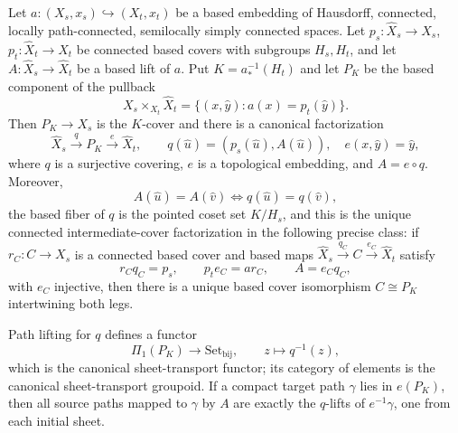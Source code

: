 \begin{theorem}\label{thm:sheet-resolution}
Let \(a:(X_s,x_s)\hookrightarrow(X_t,x_t)\) be a based embedding of Hausdorff, connected, locally path-connected, semilocally simply connected spaces. Let \(p_s:\hat X_s\to X_s\), \(p_t:\hat X_t\to X_t\) be connected based covers with subgroups \(H_s,H_t\), and let \(A:\hat X_s\to\hat X_t\) be a based lift of \(a\). Put \(K=a_*^{-1}(H_t)\) and let \(P_K\) be the based component of the pullback
\[
X_s\times_{X_t}\hat X_t=\{(x,\hat y):a(x)=p_t(\hat y)\}.
\]
Then \(P_K\to X_s\) is the \(K\)-cover and there is a canonical factorization
\[
\hat X_s\xrightarrow{\ q\ }P_K\xrightarrow{\ e\ }\hat X_t,\qquad q(\hat u)=(p_s(\hat u),A(\hat u)),\quad e(x,\hat y)=\hat y, \tag{10.51a}
\]
where \(q\) is a surjective covering, \(e\) is a topological embedding, and \(A=e\circ q\). Moreover,
\[
A(\hat u)=A(\hat v)\iff q(\hat u)=q(\hat v), \tag{10.51b}
\]
the based fiber of \(q\) is the pointed coset set \(K/H_s\), and this is the unique connected intermediate-cover factorization in the following precise class: if \(r_C:C\to X_s\) is a connected based cover and based maps \(\hat X_s\xrightarrow{q_C}C\xrightarrow{e_C}\hat X_t\) satisfy
\[
r_Cq_C=p_s,\qquad p_te_C=ar_C,\qquad A=e_Cq_C,
\]
with \(e_C\) injective, then there is a unique based cover isomorphism \(C\cong P_K\) intertwining both legs.

Path lifting for \(q\) defines a functor
\[
\Pi_1(P_K)\longrightarrow \mathrm{Set}_{\mathrm{bij}},\qquad z\mapsto q^{-1}(z), \tag{10.51c}
\]
which is the canonical sheet-transport functor; its category of elements is the canonical sheet-transport groupoid. If a compact target path \(\gamma\) lies in \(e(P_K)\), then all source paths mapped to \(\gamma\) by \(A\) are exactly the \(q\)-lifts of \(e^{-1}\gamma\), one from each initial sheet.
\end{theorem}

